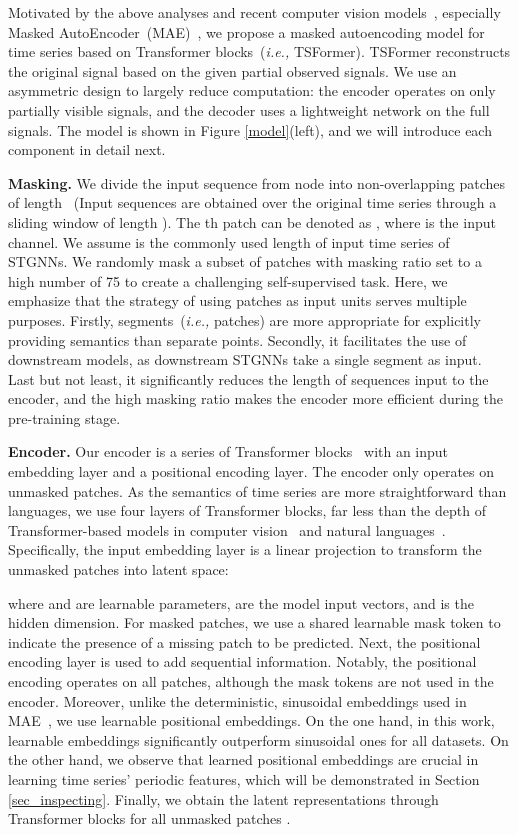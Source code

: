 \documentclass[sigconf]{acmart}
\newcommand{\ie}{\textit{i.e.,}\xspace}
\begin{document}
Motivated by the above analyses and recent computer vision models~\cite{2020ViT}, especially Masked AutoEncoder~(MAE)~\cite{2021MAE}, we propose a masked autoencoding model for time series based on Transformer blocks~(\ie TSFormer).
TSFormer reconstructs the original signal based on the given partial observed signals.
We use an asymmetric design to largely reduce computation: the encoder operates on only partially visible signals, and the decoder uses a lightweight network on the full signals.
The model is shown in Figure \ref{model}(left), and we will introduce each component in detail next.

\noindent \textbf{Masking.} 
{\color{black}
We divide the input sequence  from node  into  non-overlapping patches of length ~(Input sequences are obtained over the original time series through a sliding window of length ).
The th patch can be denoted as , where  is the input channel.}
We assume  is the commonly used length of input time series of STGNNs.
We randomly mask a subset of patches with masking ratio  set to a high number of 75 to create a challenging self-supervised task.
Here, we emphasize that the strategy of using patches as input units serves multiple purposes.
Firstly, segments~(\ie patches) are more appropriate for explicitly providing semantics than separate points.
Secondly, it facilitates the use of downstream models, as downstream STGNNs take a single segment as input.
Last but not least, it significantly reduces the length of sequences input to the encoder, and the high masking ratio  makes the encoder more efficient during the pre-training stage.



\noindent \textbf{Encoder.} 
Our encoder is a series of Transformer blocks~\cite{2017Transformer} with an input embedding layer and a positional encoding layer. 
The encoder only operates on unmasked patches.
As the semantics of time series are more straightforward than languages, we use four layers of  Transformer blocks, far less than the depth of Transformer-based models in computer vision~\cite{2020ViT, 2021MAE} and natural languages~\cite{2019BERT, 2020GPT}. 
Specifically, the input embedding layer is a linear projection to transform the unmasked patches into latent space:

where  and  are learnable parameters,  are the model input vectors, and  is the hidden dimension.
For masked patches, we use a shared learnable mask token to indicate the presence of a missing patch to be predicted.
Next, the positional encoding layer is used to add sequential information.
Notably, the positional encoding operates on all patches, although the mask tokens are not used in the encoder. 
Moreover, unlike the deterministic, sinusoidal embeddings used in MAE~\cite{2021MAE}, we use learnable positional embeddings. 
On the one hand, in this work, learnable embeddings significantly outperform sinusoidal ones for all datasets. 
On the other hand, we observe that learned positional embeddings are crucial in learning time series' periodic features, which will be demonstrated in Section \ref{sec_inspecting}.
Finally, we obtain the latent representations  through Transformer blocks for all unmasked patches .
\end{document}
